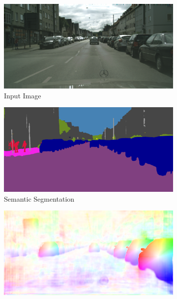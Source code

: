 \begin{figure}[t]
\begin{center}
\begin{subfigure}[t]{0.48\linewidth}
  \includegraphics[width=\linewidth]{example_instance/bielefeld_000000_001011_leftImg8bit.png}
  \caption{Input Image}
\end{subfigure}
\begin{subfigure}[t]{0.48\linewidth}
  \includegraphics[width=\linewidth]{example_instance/bielefeld_000000_001011_semantic_segmentation_rgb.png}
  \caption{Semantic Segmentation}
\end{subfigure}
\begin{subfigure}[t]{0.48\linewidth}
  \includegraphics[width=\linewidth]{example_instance/bielefeld_000000_001011_instance_prediction.png}

\end{subfigure}
\end{center}
\end{figure}
